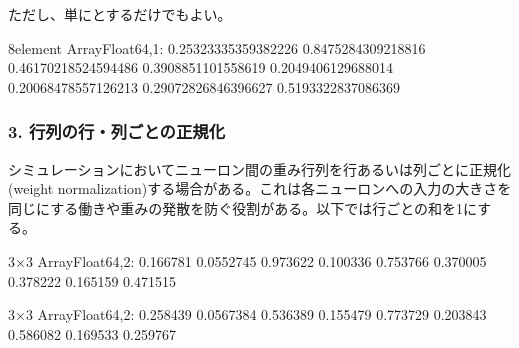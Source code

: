 \documentclass[letterpaper,10pt,english]{sphinxmanual}
\begin{document}
ただし、単にとするだけでもよい。

\begin{sphinxVerbatim}[commandchars=\\\{\}]
\PYG{p}{[}\PYG{p}{]}
\end{sphinxVerbatim}

\begin{sphinxVerbatim}[commandchars=\\\{\}]
8\PYGZhy{}element Array\PYGZob{}Float64,1\PYGZcb{}:
 0.25323335359382226
 0.8475284309218816
 0.46170218524594486
 0.3908851101558619
 0.2049406129688014
 0.20068478557126213
 0.29072826846396627
 0.5193322837086369
\end{sphinxVerbatim}


\subsubsection{3. 行列の行・列ごとの正規化}
\label{\detokenize{tips:id3}}
シミュレーションにおいてニューロン間の重み行列を行あるいは列ごとに正規化 (weight normalization)する場合がある。これは各ニューロンへの入力の大きさを同じにする働きや重みの発散を防ぐ役割がある。以下では行ごとの和を1にする。

\begin{sphinxVerbatim}[commandchars=\\\{\}]
  
\end{sphinxVerbatim}

\begin{sphinxVerbatim}[commandchars=\\\{\}]
3×3 Array\PYGZob{}Float64,2\PYGZcb{}:
 0.166781  0.0552745  0.973622
 0.100336  0.753766   0.370005
 0.378222  0.165159   0.471515
\end{sphinxVerbatim}

\begin{sphinxVerbatim}[commandchars=\\\{\}]
     
\end{sphinxVerbatim}

\begin{sphinxVerbatim}[commandchars=\\\{\}]
3×3 Array\PYGZob{}Float64,2\PYGZcb{}:
 0.258439  0.0567384  0.536389
 0.155479  0.773729   0.203843
 0.586082  0.169533   0.259767
\end{sphinxVerbatim}
\end{document}
